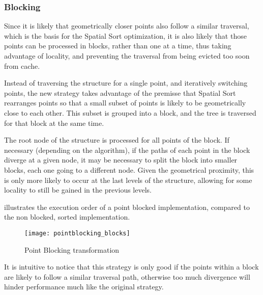 \subsubsection{Blocking}
\label{sec:optim:block}

Since it is likely that geometrically closer points also follow a similar traversal, which is the basis for the Spatial Sort optimization, it is also likely that those points can be processed in blocks, rather than one at a time, thus taking advantage of locality, and preventing the traversal from being evicted too soon from cache.

Instead of traversing the structure for a single point, and iteratively switching points, the new strategy takes advantage of the premisse that Spatial Sort rearranges points so that a small subset of points is likely to be geometrically close to each other. This subset is grouped into a block, and the tree is traversed for that block at the same time.

The root node of the structure is processed for all points of the block. If necessary (depending on the algorithm), if the paths of each point in the block diverge at a given node, it may be necessary to split the block into smaller blocks, each one going to a different node. Given the geometrical proximity, this is only more likely to occur at the last levels of the structure, allowing for some locality to still be gained in the previous levels.

 illustrates the execution order of a point blocked implementation, compared to the non blocked, sorted implementation.

\begin{figure}[!htp]
	\centering
	\texttt{[image: pointblocking\_blocks]}
	\caption{Point Blocking transformation}
	\label{fig:sort}
\end{figure}

It is intuitive to notice that this strategy is only good if the points within a block are likely to follow a similar traversal path, otherwise too much divergence will hinder performance much like the original strategy.